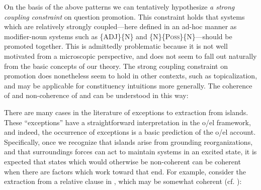   On the basis of the above patterns we can tentatively hypothesize \textit{a strong coupling constraint} on question promotion. This constraint holds that systems which are relatively strongly coupled—here defined in an ad-hoc manner as modifier-noun systems such as \{ADJ\}\{N\} and \{N\}\{P\textsc{oss}\}\{N\}—should be promoted together. This is admittedly problematic because it is not well motivated from a microscopic perspective, and does not seem to fall out naturally from the basic concepts of our theory. The strong coupling constraint on promotion does nonetheless seem to hold in other contexts, such as topicalization, and may be applicable for constituency intuitions more generally. The coherence of  and non-coherence of  and  can be understood in this way:

  \ea\label{ex:7:29}
  \label{ex:7:29a}
  \label{ex:7:29b}
  \label{ex:7:29c}
  \z
  \z
  
  There are many cases in the literature of exceptions to extraction from islands. These “exceptions” have a straightforward interpretation in the o/el framework, and indeed, the occurrence of exceptions is a basic prediction of the o/el account. Specifically, once we recognize that islands arise from grounding reorganizations, and that surroundings forces can act to maintain systems in an excited state, it is expected that states which would otherwise be non-coherent can be coherent when there are factors which work toward that end. For example, consider the extraction from a relative clause in , which may be somewhat coherent (cf. \citep{Erteschik-ShirLappin1979,Truswell2011}):

\ea  \label{ex:7:30}
\z
\z

